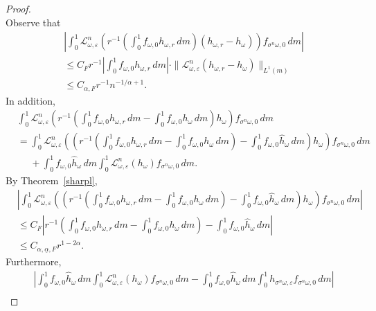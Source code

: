 \documentclass[12pt,reqno,a4paper]{article}
\begin{document}
\begin{proof}
\[	\]
	Observe that 
	\begin{equation}\label{gh4}
		\begin{split}
			& \left |\int_0^1 \mathcal L_{\omega, \varepsilon}^n \left (r^{-1} \left (\int_0^1f_{\omega, 0}h_{\omega, r}\, dm\right ) (h_{\omega, r}-h_{\omega}) \right )f_{\sigma^n \omega, 0}\, dm \right |\\
			&\le C_F r^{-1}\left |\int_0^1 f_{\omega, 0}h_{\omega, r}\, dm\right | \cdot \|\mathcal L_{\omega, \varepsilon}^n (h_{\omega, r}-h_\omega)\|_{L^1(m)} \\
			&\le C_{\alpha, F}  r^{-1}n^{-1/\alpha+1}.
		\end{split}
	\end{equation}
	In addition, 
	\[
	\begin{split}
		&\int_0^1 \mathcal L_{\omega, \varepsilon}^n \left (r^{-1}\left (\int_0^1 f_{\omega, 0}h_{\omega, r}\, dm-\int_0^1f_{\omega, 0}h_\omega \, dm\right )h_\omega \right )f_{\sigma^n \omega, 0}\, dm \\
		&=\int_0^1 \mathcal L_{\omega, \varepsilon}^n \left ( \left (r^{-1}\left (\int_0^1 f_{\omega, 0}h_{\omega, r}\, dm-\int_0^1f_{\omega, 0}h_\omega \, dm\right )-\int_0^1f_{\omega, 0}\hat h_\omega \, dm\right )h_\omega \right )f_{\sigma^n \omega, 0}\, dm \\
		&\phantom{=}+\int_0^1 f_{\omega, 0}\hat h_\omega \, dm \int_0^1 \mathcal L_{\omega, \varepsilon}^n (h_\omega) f_{\sigma^n \omega, 0}\, dm.
	\end{split}
	\]
	By Theorem~\ref{sharpl},\begin{equation}\label{gh5}
		\begin{split}
			& \left |\int_0^1 \mathcal L_{\omega, \varepsilon}^n \left ( \left (r^{-1}\left (\int_0^1 f_{\omega, 0}h_{\omega, r}\, dm-\int_0^1f_{\omega, 0}h_\omega \, dm\right )-\int_0^1f_{\omega, 0}\hat h_\omega \, dm\right )h_\omega \right )f_{\sigma^n \omega, 0}\, dm\right | \\
			&\le C_F \left |r^{-1}\left (\int_0^1 f_{\omega, 0}h_{\omega, r}\, dm-\int_0^1f_{\omega, 0}h_\omega \, dm\right )-\int_0^1f_{\omega, 0}\hat h_\omega \, dm\right |  \\
			&\le C_{\alpha, \underline{\alpha}, F} r^{1-2\alpha}.
		\end{split}
	\end{equation}
	Furthermore, 
	\begin{equation}\label{gh6}
		\begin{split}
			& \left |\int_0^1 f_{\omega, 0}\hat h_\omega \, dm \int_0^1 \mathcal L_{\omega, \varepsilon}^n (h_\omega) f_{\sigma^n \omega, 0}\, dm-\int_0^1 f_{\omega, 0}\hat h_\omega \, dm \int_0^1 h_{\sigma^n \omega, \varepsilon} f_{\sigma^n \omega, 0}\, dm \right | \\

\end{split}
\end{equation}
\end{proof}
\end{document}
